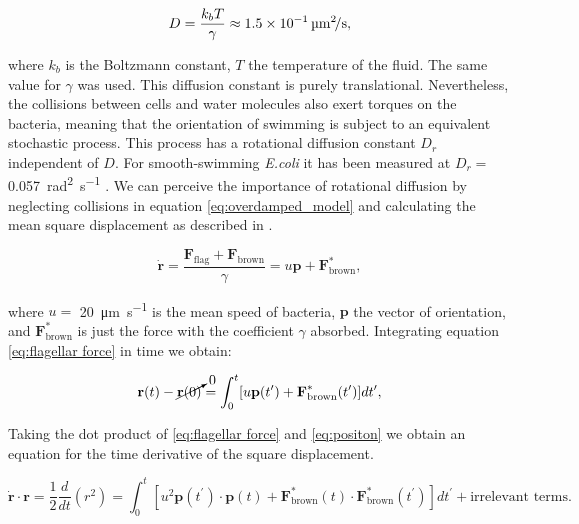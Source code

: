 \begin{equation}
	D = \frac{k_bT}{\gamma} \approx \SI[per-mode = symbol]{1.5d-1}{\square\micro\meter \per \second},
\end{equation}
 
where $k_b$ is the Boltzmann constant, $T$ the temperature of the fluid. The same value for $\gamma$ was used. This diffusion constant is purely translational. Nevertheless, the collisions between cells and water molecules also exert torques on the bacteria, meaning that the orientation of swimming is subject to an equivalent stochastic process. This process has a rotational diffusion constant $D_r$ independent of $D$. For smooth-swimming \textit{E.coli} it has been measured at $D_r=$ \SI[per-mode = symbol]{0.057}{\square\radian \per \second} \cite{Drescher2011FluidScattering}. We can perceive the importance of rotational diffusion by neglecting collisions in equation \eqref{eq:overdamped_model} and calculating the mean square displacement as described in \cite{Lauga2020TheMotility}.

\begin{equation} \label{eq:flagellar force}
	 \dot{\textbf{r}} =\frac{\textbf{F}_{\text{flag}} + \textbf{F}_{\text{brown}} }{\gamma} = u \textbf{p} + \textbf{F}^*_{\text{brown}},
\end{equation}

where $u=$ \SI[per-mode = symbol]{20}{\micro\meter \per \second} is the mean speed of bacteria, $\textbf{p}$ the vector of orientation, and $\textbf{F}^*_{\text{brown}}$ is just the force with the coefficient $\gamma$ absorbed. Integrating equation \eqref{eq:flagellar force} in time we obtain:

\begin{equation} \label{eq:positon}
	\textbf{r}(t) - \cancelto{0}{\textbf{r}(0)}  = \int_0^t [u \textbf{p}(t^\prime) +  \textbf{F}^*_{\text{brown}}(t^\prime)  ]dt^\prime ,
\end{equation}

Taking the dot product of \eqref{eq:flagellar force} and \eqref{eq:positon} we obtain an equation for the time derivative of the square displacement.

\begin{equation} \label{eq:derivative of msd}
	\dot{\textbf{r}} \cdot \textbf{r} = \frac{1}{2}\frac{d}{dt} (r^2) = \int_0^t  [u^2 \textbf{p}(t^\prime) \cdot \textbf{p}(t) + \textbf{F}^*_{\text{brown}}(t) \cdot \textbf{F}^*_{\text{brown}}(t^\prime)]dt^\prime + \text{irrelevant terms}.
\end{equation}


